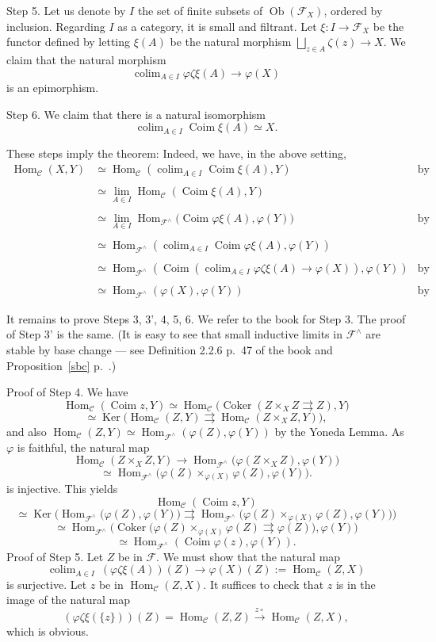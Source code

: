 \documentclass[12pt]{article}
\theoremstyle{remark}
\theoremstyle{definition}
\newcommand{\C}{\mathcal C}
\newcommand{\F}{\mathcal F}
\DeclareMathOperator*{\coli}{colim}
\DeclareMathOperator{\Coim}{Coim}
\DeclareMathOperator{\Coker}{Coker}
\DeclareMathOperator{\Hom}{Hom}%
\DeclareMathOperator{\Ker}{Ker}
\DeclareMathOperator{\Ob}{Ob}
\begin{document}
\noindent Step 5. Let us denote by $I$ the set of finite subsets of $\Ob(\F_X)$, ordered by inclusion. Regarding $I$ as a category, it is small and filtrant. Let $\xi:I\to\F_X$ be the functor defined by letting $\xi(A)$ be the natural morphism $\bigsqcup_{z\in A}\zeta(z)\to X$. We claim that the natural morphism 
$$
\coli_{A\in I}\varphi\zeta\xi(A)\to\varphi(X) 
$$ 
is an epimorphism.

\noindent Step 6. We claim that there is a natural isomorphism 
$$
\coli_{A\in I}\Coim\xi(A)\simeq X. 
$$

These steps imply the theorem: Indeed, we have, in the above setting, 
%
\begin{align*} 
%
\Hom_\C(X,Y)&\simeq\Hom_\C\left(\coli_{A\in I}\Coim\xi(A),Y\right)&\text{by Step 6}\\ \\ 
%
&\simeq\lim_{A\in I}\Hom_\C(\Coim\xi(A),Y)\\ \\ 
%
&\simeq\lim_{A\in I}\Hom_{\F^\wedge}\Big(\Coim\varphi\xi(A),\varphi(Y)\Big)&\text{by Step 4}\\ \\ 
%
&\simeq\Hom_{\F^\wedge}\left(\coli_{A\in I}\Coim\varphi\xi(A),\varphi(Y)\right)\\ \\ 
%
&\simeq\Hom_{\F^\wedge}\left(\Coim\left(\coli_{A\in I}\varphi\zeta\xi(A)\to\varphi(X)\right),\varphi(Y)\right)&\text{by Step 3'}\\ \\ 
%
&\simeq\Hom_{\F^\wedge}(\varphi(X),\varphi(Y))&\text{by Step 5.}
%
\end{align*} 
%

It remains to prove Steps 3, 3', 4, 5, 6. We refer to the book for Step 3. The proof of Step 3' is the same. (It is easy to see that small inductive limits in $\F^\wedge$ are stable by base change --- see Definition 2.2.6 p.~47 of the book and Proposition~\ref{sbc} p.~\pageref{sbc}.) 

\noindent Proof of Step 4. We have 
$$
\Hom_\C(\Coim z,Y)\simeq\Hom_\C\big(\Coker(Z\times_XZ\rightrightarrows Z),Y\big)
$$
$$
\simeq\Ker\big(\Hom_\C(Z,Y)\rightrightarrows\Hom_\C(Z\times_XZ,Y)\big),
$$ 
and also $\Hom_\C(Z,Y)\simeq\Hom_{\F^\wedge}(\varphi(Z),\varphi(Y))$ by the Yoneda Lemma. As $\varphi$ is faithful, the natural map 
$$
\Hom_\C(Z\times_XZ,Y)\to\Hom_{\F^\wedge}\big(\varphi(Z\times_XZ),\varphi(Y)\big)
$$
$$
\simeq\Hom_{\F^\wedge}\big(\varphi(Z)\times_{\varphi(X)}\varphi(Z),\varphi(Y)\big).
$$ 
is injective. This yields 
$$
\Hom_\C(\Coim z,Y)
$$
$$
\simeq\Ker\Big(\Hom_{\F^\wedge}\big(\varphi(Z),\varphi(Y)\big)\rightrightarrows\Hom_{\F^\wedge}\big(\varphi(Z)\times_{\varphi(X)}\varphi(Z),\varphi(Y)\big)\Big)
$$
$$
\simeq\Hom_{\F^\wedge}\Big(\Coker\big(\varphi(Z)\times_{\varphi(X)}\varphi(Z)\rightrightarrows\varphi(Z)\big),\varphi(Y)\Big)
$$
$$
\simeq\Hom_{\F^\wedge}(\Coim\varphi(z),\varphi(Y)).
$$
Proof of Step 5. Let $Z$ be in $\F$. We must show that the natural map 
$$
\coli_{A\in I}\ (\varphi\zeta\xi(A))(Z)\to\varphi(X)(Z):=\Hom_\C(Z,X) 
$$
is surjective. Let $z$ be in $\Hom_\C(Z,X)$. It suffices to check that $z$ is in the image of the natural map 
$$
(\varphi\zeta\xi(\{z\}))(Z)=\Hom_\C(Z,Z)\xrightarrow{z\circ}\Hom_\C(Z,X),
$$
which is obvious. 
\end{document}

